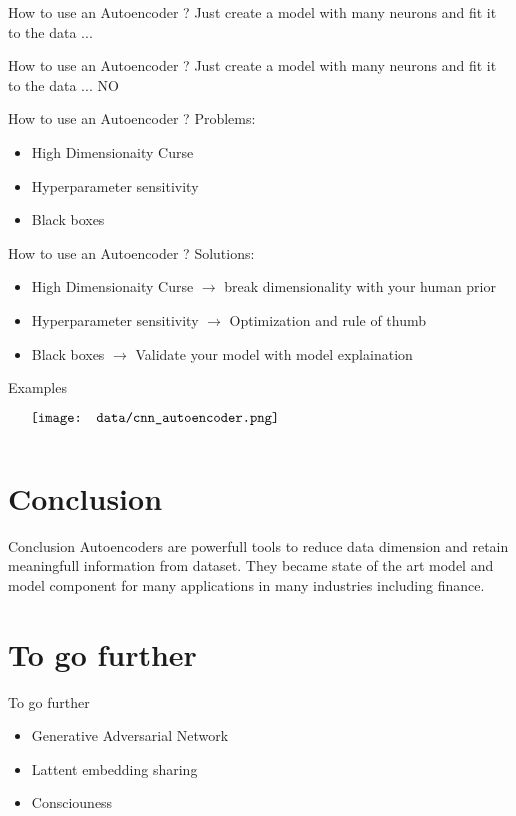 \documentclass{beamer}
\begin{document}
\begin{frame}{How to use an Autoencoder ?}
    Just create a model with many neurons and fit it to the data ...
\end{frame}

\begin{frame}{How to use an Autoencoder ?}
    Just create a model with many neurons and fit it to the data ... NO
\end{frame}

\begin{frame}{How to use an Autoencoder ?}
    Problems:
    \begin{itemize}
        \item High Dimensionaity Curse
        \item Hyperparameter sensitivity 
        \item Black boxes 
    \end{itemize}
\end{frame}

\begin{frame}{How to use an Autoencoder ?}
    Solutions:
    \begin{itemize}
        \item High Dimensionaity Curse $\rightarrow$ break dimensionality with your human prior
        \item Hyperparameter sensitivity $\rightarrow$ Optimization and rule of thumb 
        \item Black boxes $\rightarrow$ Validate your model with model explaination
    \end{itemize}
\end{frame}

\begin{frame}{Examples}
    \begin{minipage}{5in}
    \centering
    $\vcenter{
    \texttt{[image: data/cnn\_autoencoder.png]} \\
    }$
    \end{minipage}
\end{frame}

\section{Conclusion}
\begin{frame}{Conclusion}
    Autoencoders are powerfull tools to reduce data dimension and retain meaningfull information from dataset.
    They became state of the art model and model component for many applications in many industries including finance.
\end{frame}

\section{To go further}
\begin{frame}{To go further}
\begin{itemize}
        \item Generative Adversarial Network
        \item Lattent embedding sharing
        \item Consciouness
\end{itemize}
\end{frame}
\end{document}
